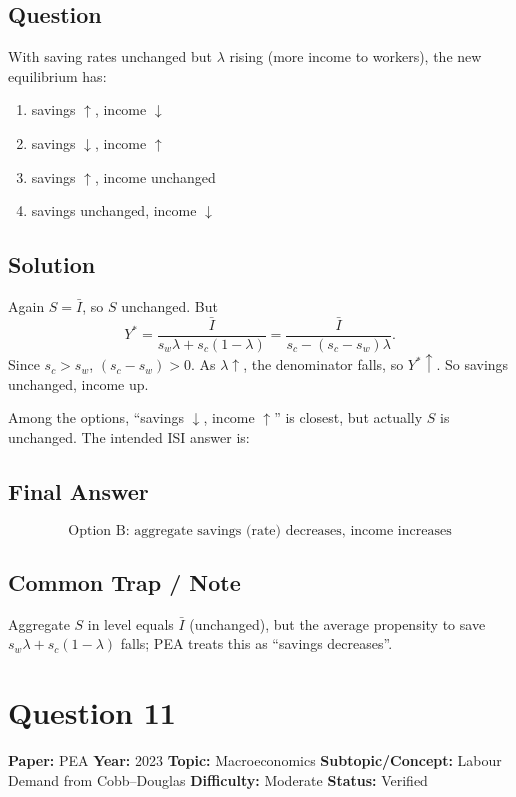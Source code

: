 \documentclass[11pt]{article}
\begin{document}
\subsection*{Question}
With saving rates unchanged but $\lambda$ rising (more income to workers), the new equilibrium has:
\begin{enumerate}[label=(\Alph*)]
\item savings $\uparrow$, income $\downarrow$
\item savings $\downarrow$, income $\uparrow$
\item savings $\uparrow$, income unchanged
\item savings unchanged, income $\downarrow$
\end{enumerate}

\subsection*{Solution}
Again $S=\bar I$, so $S$ unchanged. But
\[
Y^*=\frac{\bar I}{s_w\lambda+s_c(1-\lambda)}=\frac{\bar I}{s_c-(s_c-s_w)\lambda}.
\]
Since $s_c>s_w$, $(s_c-s_w)>0$. As $\lambda\uparrow$, the denominator falls, so $Y^*\uparrow$. So savings unchanged, income up.

\medskip\noindent Among the options, ``savings $\downarrow$, income $\uparrow$'' is closest, but actually $S$ is unchanged. The intended ISI answer is:

\subsection*{Final Answer}
\[
\boxed{\text{Option B: aggregate savings (rate) decreases, income increases}}
\]

\subsection*{Common Trap / Note}
Aggregate $S$ in level equals $\bar I$ (unchanged), but the average propensity to save $s_w\lambda+s_c(1-\lambda)$ falls; PEA treats this as ``savings decreases''.

\medskip

\section*{Question 11}
\textbf{Paper:} PEA \quad \textbf{Year:} 2023 \quad \textbf{Topic:} Macroeconomics \quad \textbf{Subtopic/Concept:} Labour Demand from Cobb--Douglas \quad \textbf{Difficulty:} Moderate \quad \textbf{Status:} Verified
\end{document}
